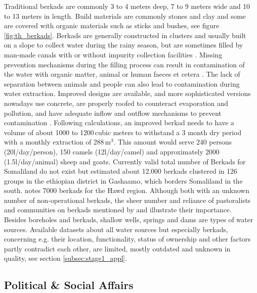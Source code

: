 Traditional berkads are commonly 3 to 4 meters deep, 7 to 9 meters wide and 10 to 13 meters in length. Build materials are commonly stones and clay and some are covered with organic materials such as sticks and bushes, see figure \ref{fig:th_berkads}. Berkads are generally constructed in clusters and usually built on a slope to collect water during the rainy season, but are sometimes filled by man-made canals with or without impurity collection facilities \autocite{walkerChangingPastoralismEthiopian1998}. Missing prevention mechanisms during the filling process can result in contamination of the water with organic matter, animal or human faeces et cetera \autocite{mercycorpsIMPROVEDBERKADDESIGNS2017}. The lack of separation between animals and people can also lead to contamination during water extraction. Improved designs are available, and more sophisticated versions nowadays use concrete, are properly roofed to counteract evaporation and pollution, and have adequate inflow and outflow mechanisms to prevent contamination \autocite{mercycorpsIMPROVEDBERKADDESIGNS2017, petrucciLandscapeLandformsNorthern2022}. Following \autocite{mercycorpsIMPROVEDBERKADDESIGNS2017} calculations, an improved berkad needs to have a volume of about 1000 to 1200\,cubic meters to withstand a 3 month dry period with a monthly extraction of 288\,m$^3$. This amount would serve 240 persons (20l/day/person), 150 camels (12l/day/camel) and approximately 2000 (1.5l/day/animal) sheep and goats. Currently valid total number of Berkads for Somaliland do not exist but \autocite{walkerChangingPastoralismEthiopian1998} estimated about 12.000 berkads clustered in 126 groups in the ethiopian district in Gashaamo, which borders Somaliland in the south. \autocite{birchSomalilandSomaliRegion2008} notes 7000 berkads for the Hawd region. Although both with an unknown number of non-operational berkads, the sheer number and reliance of pastoralists and communities on berkads mentioned by \autocite{walkerChangingPastoralismEthiopian1998} and \autocite{birchSomalilandSomaliRegion2008} illustrate their importance. Besides boreholes and berkads, shallow wells, springs and dams are types of water sources. Available datasets about all water sources but especially berkads, concerning e.g. their location, functionality, status of ownership and other factors partly contradict each other, are limited, mostly outdated and unknown in quality, see section \ref{subsec:stage1_appl}\autocite{swalimSomaliaWaterSources}. 

\subsection{Political \& Social Affairs}

